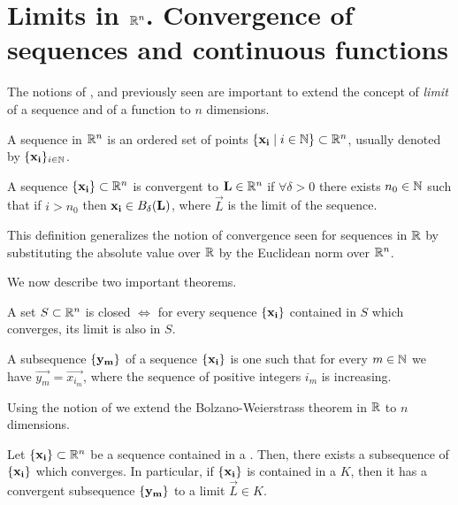 \section{Limits in $\Rtn$. Convergence of sequences and continuous functions}

The notions of ,  and  previously seen are important 
to extend the concept of \textit{limit} of a sequence and of a function to $n$ dimensions.

\begin{defn}
    A sequence in $\Rtn$ is an ordered set of points $\set{\vec{x_i}\st i\in\N}\subset\Rtn$, usually denoted by 
    $\set{\vec{x_i}}_{i\in\N}$.
\end{defn}

\begin{defn}
    A sequence $\set{\vec{x_i}}\subset\Rtn$ is convergent to $\vec{L}\in\Rtn$ if $\forall\delta > 0$ there exists $n_0\in\N$
    such that if $i > n_0$ then $\vec{x_i}\in\oball{\delta}{\vec{L}}$, where $\vec{L}$ is the limit of the sequence.
\end{defn}

\begin{note}
    This definition generalizes the notion of convergence seen for sequences in $\R$ by substituting the absolute value 
    over $\R$ by the Euclidean norm over $\Rtn$.
\end{note}

We now describe two important theorems.

\begin{theorem}
    A set $S\subset\Rtn$ is closed $\iff$ for every sequence $\{ \mathbf{x_i} \}$ contained in $S$ which converges, its limit
    is also in $S$.
\end{theorem}

\begin{defn}\label{def:subsequence-rn}
    A subsequence $\{ \mathbf{y_m} \}$ of a sequence $\{ \mathbf{x_i} \}$ is one such that for every $m\in\N$ we have $\vec{y_m} =
    \vec{x_{i_m}}$, where the sequence of positive integers $i_m$ is increasing. 
\end{defn}

Using the notion of  we extend the Bolzano-Weierstrass theorem in $\R$ to $n$ dimensions.

\begin{theorem}
    Let $\set{\vec{x_i}}\subset\Rtn$ be a sequence contained in a . Then, there exists a subsequence
    of $\{ \mathbf{x_i} \}$ which converges. In particular, if $\{ \mathbf{x_i} \}$ is contained in a  $K$,
    then it has a convergent subsequence $\{ \mathbf{y_m} \}$ to a limit $\vec{L}\in K$.
\end{theorem}

